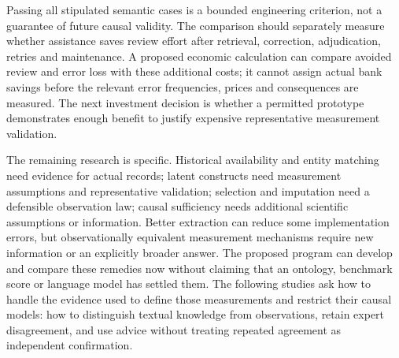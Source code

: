 Passing all stipulated semantic cases is a bounded engineering criterion,
not a guarantee of future causal validity. The comparison should separately
measure whether assistance saves review effort after retrieval, correction,
adjudication, retries and maintenance. A proposed economic calculation can
compare avoided review and error loss with these additional costs; it cannot
assign actual bank savings before the relevant error frequencies, prices
and consequences are measured. The next investment decision is whether a
permitted prototype demonstrates enough benefit to justify expensive
representative measurement validation.

The remaining research is specific. Historical availability and entity
matching need evidence for actual records; latent constructs need measurement
assumptions and representative validation; selection and imputation need a
defensible observation law; causal sufficiency needs additional scientific
assumptions or information. Better extraction can reduce some implementation
errors, but observationally equivalent measurement mechanisms require new
information or an explicitly broader answer. The proposed program can develop
and compare these remedies now without claiming that an ontology, benchmark
score or language model has settled them. The following studies ask how to
handle the evidence used to define those measurements and restrict their
causal models: how to distinguish textual knowledge from observations, retain
expert disagreement, and use advice without treating repeated agreement as
independent confirmation.
\label{exec17:ontology-end}
